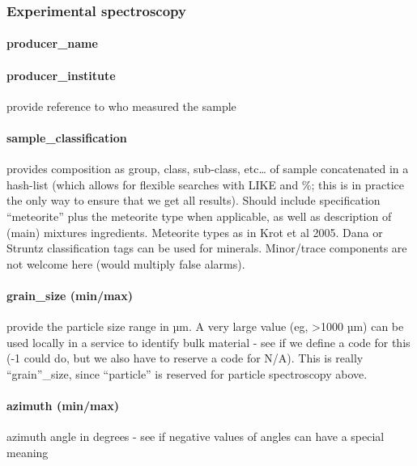 \documentclass[11pt,a4paper]{ivoa}
\begin{document}
\subsubsection{Experimental spectroscopy\\}

\paragraph{producer\_name}

\paragraph{producer\_institute}

provide reference to who measured the sample

\paragraph{sample\_classification}

provides composition as group, class, sub-class, etc… of sample concatenated in a hash-list (which allows for flexible searches with LIKE and \%; this is in practice the only way to ensure that we get all results). Should include specification ``meteorite'' plus the meteorite type when applicable, as well as description of (main) mixtures ingredients. Meteorite types as in Krot et al 2005. Dana or Struntz classification tags can be used for minerals. Minor/trace components are not welcome here (would multiply false alarms).

\paragraph{\textbf{grain\_size (min/max)}}

provide the particle size range in µm. A very large value (eg, >1000 µm) can be used locally in a service to identify bulk material - see if we define a code for this (-1 could do, but we also have to reserve a code for N/A). This is really ``grain''\_size, since ``particle'' is reserved for particle spectroscopy above.\\

\paragraph{\textbf{azimuth} (min/max)}

azimuth angle in degrees - see if negative values of angles can have a special meaning
\end{document}
